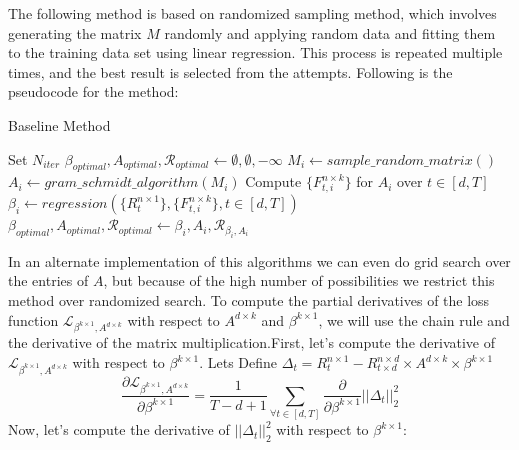 \newline \newline The following method is based on randomized sampling method, which involves generating the matrix $M$ randomly and applying random data and fitting them to the training data set using linear regression. This process is repeated multiple times, and the best result is selected from the attempts.
Following is the pseudocode for the method:
\begin{algorithm}[H]
\caption{Baseline Method}\label{lfm_baseline_method}
\begin{algorithmic}
\State Set $N_{iter}$
\State $\beta_{optimal}, A_{optimal}, \mathcal{R}_{optimal} \gets \emptyset, \emptyset, -\infty $
    \State $M_i \gets sample\_random\_matrix()$
    \State $A_i \gets gram\_schmidt\_algorithm(M_i)$
    \State Compute $\{F^{n\times k}_{t, i}\}$ for $A_i$ over $t\in [d,T]$
    \State $\beta_i \gets regression(\{R^{n\times 1}_{t}\},\{F^{n\times k}_{t, i}\}, t\in [d,T])$
      
        \State $\beta_{optimal}, A_{optimal}, \mathcal{R}_{optimal} \gets \beta_{i}, A_{i}, \mathcal{R}_{\beta_i, A_i} $
    \EndIf 
\EndFor
\end{algorithmic}
\end{algorithm} In an alternate implementation of this algorithms we can even do grid search over the entries of $A$, but because of the high number of possibilities we restrict this method over randomized search. 
To compute the partial derivatives of the loss function $\mathcal{L}_{\beta^{k \times 1}, A^{d\times k}}$ with respect to $A^{d\times k}$ and $\beta^{k \times 1}$, we will use the chain rule and the derivative of the matrix multiplication.\newline \newline First, let's compute the derivative of $\mathcal{L}_{\beta^{k \times 1}, A^{d\times k}}$ with respect to $\beta^{k \times 1}$. Lets Define $\Delta_t = R^{n\times 1}_t-R^{n\times d}_{t\times d}\times A^{d\times k} \times \beta^{k \times 1}$
\begin{equation}
    \frac{\partial \mathcal{L}_{\beta^{k \times 1}, A^{d\times k}}}{\partial \beta^{k \times 1}} = \frac{1}{T-d+1} \sum_{\forall t\in [d,T]} \frac{\partial}{\partial \beta^{k \times 1}} ||\Delta_t||_2^2 
\end{equation}
\newline Now, let's compute the derivative of $||\Delta_t||_2^2$ with respect to $\beta^{k\times 1}$:

